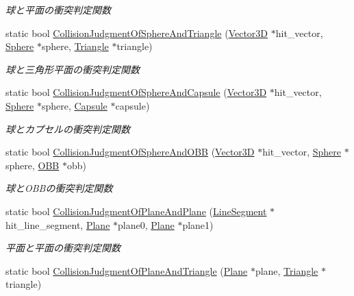 \begin{DoxyCompactItemize}
\begin{DoxyCompactList}\small\item\em 球と平面の衝突判定関数 \end{DoxyCompactList}\item 
static bool \mbox{\hyperlink{class_collision_calculation_a533512a0f0ce833680f1e50a2b224e57}{Collision\+Judgment\+Of\+Sphere\+And\+Triangle}} (\mbox{\hyperlink{class_vector3_d}{Vector3D}} $\ast$hit\+\_\+vector, \mbox{\hyperlink{class_sphere}{Sphere}} $\ast$sphere, \mbox{\hyperlink{class_triangle}{Triangle}} $\ast$triangle)
\begin{DoxyCompactList}\small\item\em 球と三角形平面の衝突判定関数 \end{DoxyCompactList}\item 
static bool \mbox{\hyperlink{class_collision_calculation_a8df4528ada47cb62cdf7835d0387409c}{Collision\+Judgment\+Of\+Sphere\+And\+Capsule}} (\mbox{\hyperlink{class_vector3_d}{Vector3D}} $\ast$hit\+\_\+vector, \mbox{\hyperlink{class_sphere}{Sphere}} $\ast$sphere, \mbox{\hyperlink{class_capsule}{Capsule}} $\ast$capsule)
\begin{DoxyCompactList}\small\item\em 球とカプセルの衝突判定関数 \end{DoxyCompactList}\item 
static bool \mbox{\hyperlink{class_collision_calculation_aebe109fb7cc435ac79a3255909b445b1}{Collision\+Judgment\+Of\+Sphere\+And\+O\+BB}} (\mbox{\hyperlink{class_vector3_d}{Vector3D}} $\ast$hit\+\_\+vector, \mbox{\hyperlink{class_sphere}{Sphere}} $\ast$sphere, \mbox{\hyperlink{class_o_b_b}{O\+BB}} $\ast$obb)
\begin{DoxyCompactList}\small\item\em 球と\+O\+B\+Bの衝突判定関数 \end{DoxyCompactList}\item 
static bool \mbox{\hyperlink{class_collision_calculation_acd4d60e71a42eb8934d60fa2c99186ea}{Collision\+Judgment\+Of\+Plane\+And\+Plane}} (\mbox{\hyperlink{class_line_segment}{Line\+Segment}} $\ast$hit\+\_\+line\+\_\+segment, \mbox{\hyperlink{class_plane}{Plane}} $\ast$plane0, \mbox{\hyperlink{class_plane}{Plane}} $\ast$plane1)
\begin{DoxyCompactList}\small\item\em 平面と平面の衝突判定関数 \end{DoxyCompactList}\item 
static bool \mbox{\hyperlink{class_collision_calculation_a854226ccd02c8afe5cec91470253ff92}{Collision\+Judgment\+Of\+Plane\+And\+Triangle}} (\mbox{\hyperlink{class_plane}{Plane}} $\ast$plane, \mbox{\hyperlink{class_triangle}{Triangle}} $\ast$triangle)

\end{DoxyCompactItemize}
